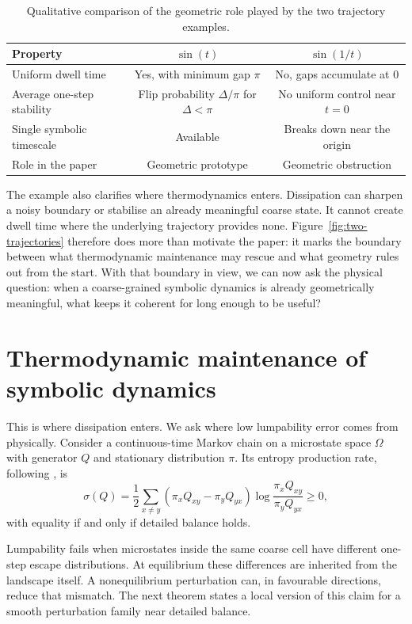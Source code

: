 \documentclass[11pt,a4paper]{article}
\theoremstyle{definition}
\theoremstyle{remark}
\begin{document}
\begin{table}[t]
\centering\small
\caption{Qualitative comparison of the geometric role played by the two trajectory examples.}
\label{tab:comparison}
\begin{tabular}{@{}lcc@{}}
\toprule
Property & $\sin(t)$ & $\sin(1/t)$ \\
\midrule
Uniform dwell time & Yes, with minimum gap $\pi$ & No, gaps accumulate at $0$ \\
Average one-step stability & Flip probability $\Delta/\pi$ for $\Delta<\pi$ & No uniform control near $t=0$ \\
Single symbolic timescale & Available & Breaks down near the origin \\
Role in the paper & Geometric prototype & Geometric obstruction \\
\bottomrule
\end{tabular}
\end{table}

The example also clarifies where thermodynamics enters. Dissipation can sharpen a noisy boundary or stabilise an already meaningful coarse state. It cannot create dwell time where the underlying trajectory provides none. Figure~\ref{fig:two-trajectories} therefore does more than motivate the paper: it marks the boundary between what thermodynamic maintenance may rescue and what geometry rules out from the start. With that boundary in view, we can now ask the physical question: when a coarse-grained symbolic dynamics is already geometrically meaningful, what keeps it coherent for long enough to be useful?

\section{Thermodynamic maintenance of symbolic dynamics}\label{sec:dissipation}

This is where dissipation enters. We ask where low lumpability error comes from physically. Consider a continuous-time Markov chain on a microstate space $\Omega$ with generator $Q$ and stationary distribution $\pi$. Its entropy production rate, following \citet{schnakenberg1976}, is
\begin{equation}\label{eq:entropy-prod}
\sigma(Q) =
\frac{1}{2}\sum_{x\neq y}
(\pi_x Q_{xy}-\pi_y Q_{yx})
\log\frac{\pi_x Q_{xy}}{\pi_y Q_{yx}}
\geq 0,
\end{equation}
with equality if and only if detailed balance holds.

Lumpability fails when microstates inside the same coarse cell have different one-step escape distributions. At equilibrium these differences are inherited from the landscape itself. A nonequilibrium perturbation can, in favourable directions, reduce that mismatch. The next theorem states a local version of this claim for a smooth perturbation family near detailed balance.
\end{document}

